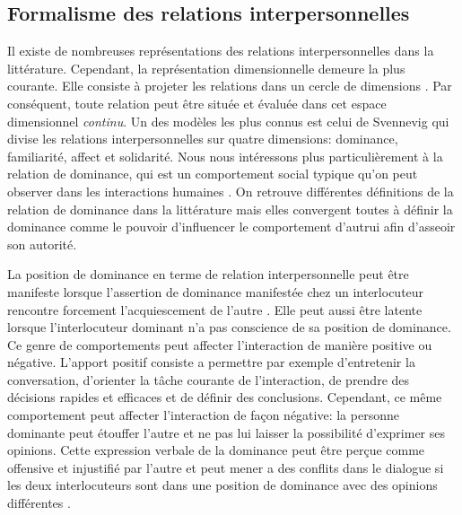 \documentclass [french]{sig-alternate-05-2015}
\begin{document}
\subsection{Formalisme des relations interpersonnelles}
\label{RI}
Il existe de nombreuses représentations des relations interpersonnelles dans la littérature. Cependant, la représentation dimensionnelle demeure la plus courante. Elle consiste à projeter les relations dans un cercle de dimensions \cite{wiggins}. Par conséquent, toute relation peut être située et évaluée dans cet espace dimensionnel \textit{continu}. Un des modèles les plus connus est celui de Svennevig \cite{svennevig2000getting} qui divise les relations interpersonnelles sur quatre dimensions: dominance, familiarité, affect et solidarité. Nous nous intéressons plus particulièrement à la relation de dominance, qui est un comportement social typique qu'on peut observer dans les interactions humaines \cite{dunbar2005perceptions}. On retrouve différentes définitions de la relation de dominance dans la littérature mais elles convergent toutes à définir la dominance comme le pouvoir d'influencer le comportement d'autrui afin d'asseoir son autorité\cite{dunbar2005perceptions,rogers1979domineeringness,moon1998intimate}.

La position de dominance en terme de relation interpersonnelle peut être manifeste \cite{dunbar2005perceptions} lorsque l'assertion de dominance manifestée chez un interlocuteur rencontre forcement  l'acquiescement de l'autre \cite{rogers1979domineeringness}. Elle peut aussi être latente \cite{komter1989hidden} lorsque l'interlocuteur dominant n'a pas conscience de sa position de dominance. Ce genre de comportements peut affecter l'interaction de manière positive ou négative. L'apport positif consiste a permettre par exemple d'entretenir la conversation, d'orienter la tâche courante de l'interaction, de prendre des décisions rapides et efficaces et de définir des conclusions. Cependant, ce même comportement peut affecter l'interaction de façon négative: la personne dominante peut étouffer l'autre et ne pas lui laisser la possibilité d'exprimer ses opinions. Cette expression verbale de la dominance peut être perçue comme offensive et injustifié par l'autre et peut mener a des conflits dans le dialogue si les deux interlocuteurs sont dans une position de dominance avec des opinions différentes \cite{zablotskaya}.
\end{document}
